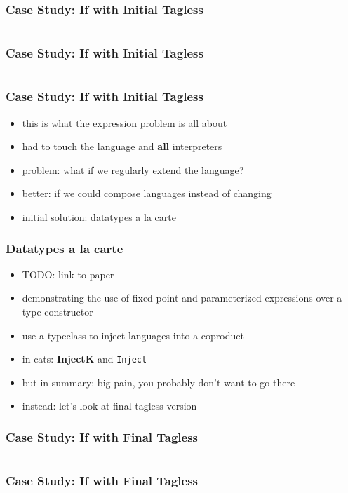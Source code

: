 \documentclass[aspectratio=169, hyperref={colorlinks, linkcolor=beamer@centricgreen}, urlcolor=links]{beamer}
\begin{document}
\begin{frame}[fragile]
  \frametitle{Case Study: If with Initial Tagless}
  \inputminted[fontsize=\footnotesize]{scala}{snippets/initial-tagless-interp-if.scala}
\end{frame}

\begin{frame}[fragile]
  \frametitle{Case Study: If with Initial Tagless}
  \inputminted[fontsize=\footnotesize]{scala}{snippets/initial-tagless-handle-if.scala}
\end{frame}

\begin{frame}
  \frametitle{Case Study: If with Initial Tagless}
  \begin{itemize}
  \item this is what the expression problem is all about
  \item had to touch the language and \textbf{all} interpreters
  \item problem: what if we regularly extend the language?
  \item better: if we could compose languages instead of changing
  \item initial solution: datatypes a la carte
  \end{itemize}
\end{frame}

\begin{frame}
  \frametitle{Datatypes a la carte}
  \begin{itemize}
  \item TODO: link to paper
  \item demonstrating the use of fixed point and parameterized expressions over a type constructor
  \item use a typeclass to inject languages into a coproduct
  \item in cats: \textbf{InjectK} and \texttt{Inject}
  \item but in summary: big pain, you probably don't want to go there
  \item instead: let's look at final tagless version
  \end{itemize}
\end{frame}

\begin{frame}[fragile]
  \frametitle{Case Study: If with Final Tagless}
  \inputminted[fontsize=\footnotesize]{scala}{snippets/final-tagless-expr-if.scala}
\end{frame}

\begin{frame}[fragile]
  \frametitle{Case Study: If with Final Tagless}
  \inputminted[fontsize=\footnotesize]{scala}{snippets/final-tagless-sample-if.scala}
\end{frame}
\end{document}
